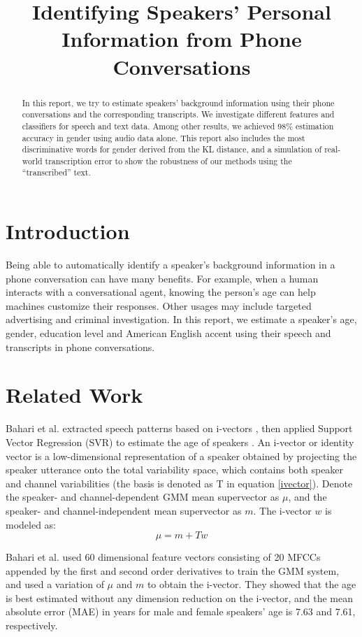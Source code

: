 \documentclass[a4paper]{article}
\title{Identifying Speakers' Personal Information from Phone Conversations}
\begin{document}
\maketitle


\begin{abstract}
In this report, we try to estimate speakers' background information using their phone conversations and the corresponding transcripts. We investigate different features and classifiers for speech and text data. Among other results, we achieved 98\% estimation accuracy in gender using audio data alone. This report also includes the most discriminative words for gender derived from the KL distance, and a simulation of real-world transcription error to show the robustness of our methods using the ``transcribed'' text.
\end{abstract}


\section{Introduction}
Being able to automatically identify a speaker's background information in a phone conversation can have many benefits. For example, when a human interacts with a conversational agent, knowing the person's age can help machines customize their responses. Other usages may include targeted advertising and criminal investigation. In this report, we estimate a speaker's age, gender, education level and American English accent using their speech and transcripts in phone conversations.

\section{Related Work}
Bahari et al. extracted speech patterns based on i-vectors \cite{dehak}, then applied Support Vector Regression (SVR) to estimate the age of speakers \cite{bahari}. An i-vector or identity vector is a low-dimensional representation of a speaker obtained by projecting the speaker utterance onto the total variability space, which contains both speaker and channel variabilities (the basis is denoted as T in equation \ref{ivector}). Denote the speaker- and channel-dependent GMM mean supervector as $\mu$, and the speaker- and channel-independent mean supervector as $m$. The i-vector $w$ is modeled as:  
\begin{equation}
\mu = m + Tw
\label{ivector}
\end{equation}

Bahari et al. used 60 dimensional feature vectors consisting of 20 MFCCs appended by the first and second order derivatives to train the GMM system, and used a variation of $\mu$ and $m$ to obtain the i-vector. They showed that the age is best estimated without any dimension reduction on the i-vector, and the mean absolute error (MAE) in years for male and female speakers' age is 7.63 and 7.61, respectively.
\end{document}
